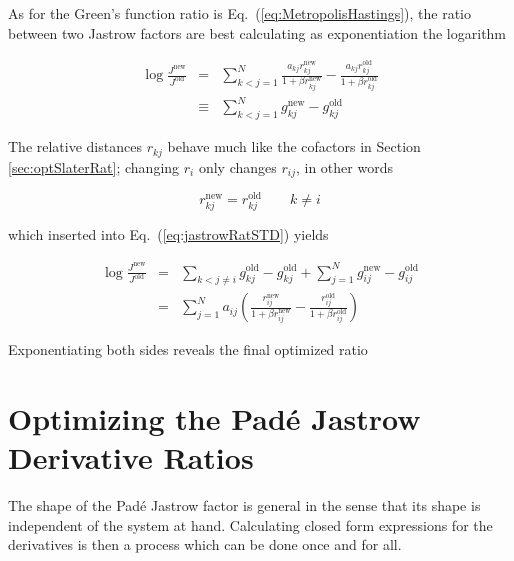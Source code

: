 As for the Green's function ratio is Eq.~(\ref{eq:MetropolisHastings}), the ratio between two Jastrow factors are best calculating as exponentiation the logarithm

\begin{eqnarray}
 \log \frac{J^\mathrm{new}}{J^\mathrm{old}} &=& \sum_{k<j = 1}^N \frac{a_{kj}r^\mathrm{new}_{kj}}{1 + \beta r^\mathrm{new}_{kj}} - \frac{a_{kj}r^\mathrm{old}_{kj}}{1 + \beta r^\mathrm{old}_{kj}} \\
                      &\equiv& \sum_{k<j = 1}^N g^\mathrm{new}_{kj} - g^\mathrm{old}_{kj} \label{eq:jastrowRatSTD}
\end{eqnarray}

The relative distances $r_{kj}$ behave much like the cofactors in Section \ref{sec:optSlaterRat}; changing $r_i$ only changes $r_{ij}$, in other words

\begin{equation}
 r^\mathrm{new}_{kj} = r^\mathrm{old}_{kj} \qquad k \ne i 
\end{equation}

which inserted into Eq.~(\ref{eq:jastrowRatSTD}) yields

\begin{eqnarray}
  \log\frac{J^\mathrm{new}}{J^\mathrm{old}} &=& \sum_{k<j \ne i} g^\mathrm{old}_{kj} - g^\mathrm{old}_{kj} + \sum_{j = 1}^N g^\mathrm{new}_{ij} - g^\mathrm{old}_{ij} \nonumber\\
                                            &=& \sum_{j = 1}^N a_{ij}\left(\frac{r^\mathrm{new}_{ij}}{1 + \beta r^\mathrm{new}_{ij}} - \frac{r^\mathrm{old}_{ij}}{1 + \beta r^\mathrm{old}_{ij}}\right)
\end{eqnarray}

Exponentiating both sides reveals the final optimized ratio 



\section{Optimizing the Padé Jastrow Derivative Ratios}

The shape of the Padé Jastrow factor is general in the sense that its shape is independent of the system at hand. Calculating closed form expressions for the derivatives is then a process which can be done once and for all. 

